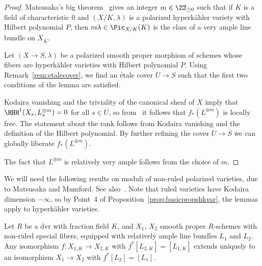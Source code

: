 \begin{proof}
    Matsusaka's big theorem~\cite{BigMatsusaka} gives an integer $m \in \ZZ_{\geq 0}$ such that if $K$ is a field of characteristic $0$ and $({X}/{K},\lambda)$ is a polarized hyperk\"ahler variety with Hilbert polynomial $P$, then $m \lambda \in \Pic_{X/K}(K)$ is the class of a very ample line bundle on $X_{\overline{K}}$.

Let $(X \rightarrow S, \lambda)$ be a polarized smooth proper morphism of schemes whose fibers are hyperk\"ahler varieties with Hilbert polynomial $P$. Using Remark~\ref{rem:etalecover}, we find an \'etale cover $U \rightarrow S$ such that the first two conditions of the lemma are satisfied.

Kodaira vanishing and the triviality of the canonical sheaf of $X$ imply that $\HHH^1(X_s,L^{\otimes m}_s) = 0$ for all $s \in U$, so from~\cite[Chapter~0, \S5, a)]{GIT} it follows that $f_*(L^{\otimes m})$ is locally free. The statement about the rank follows from Kodaira vanishing and the definition of the Hilbert polynomial. By further refining the cover $U \rightarrow S$ we can globally liberate $f_*(L^{\otimes m})$.

The fact that $L^{\otimes m}$ is relatively very ample follows from the choice of $m$.
\end{proof}

We will need the following results on moduli of non-ruled polarized varieties, due to Matsusaka and Mumford. See also~\cite[Theorem~4.3, Proposition~4.4]{Popp}. Note that ruled varieties have Kodaira dimension $-\infty$, so by Point~4 of Proposition~\ref{prop:basicpropshkvar}, the lemmas apply to hyperk\"ahler varieties.

\begin{lemma}\label{lem:separatedmoduli}
Let $R$ be a dvr with fraction field $K$, and $X_1$, $X_2$ smooth proper $R$-schemes with non-ruled special fibers, equipped with relatively ample line bundles $L_1$ and $L_2$. Any isomorphism $f\colon X_{1,K} \rightarrow X_{2,K}$ with $f^* [L_{2,K}] = [L_{1,K}]$ extends uniquely to an isomorphism $X_1 \rightarrow X_2$ with $f^*[L_2] = [L_1]$.
\end{lemma}

